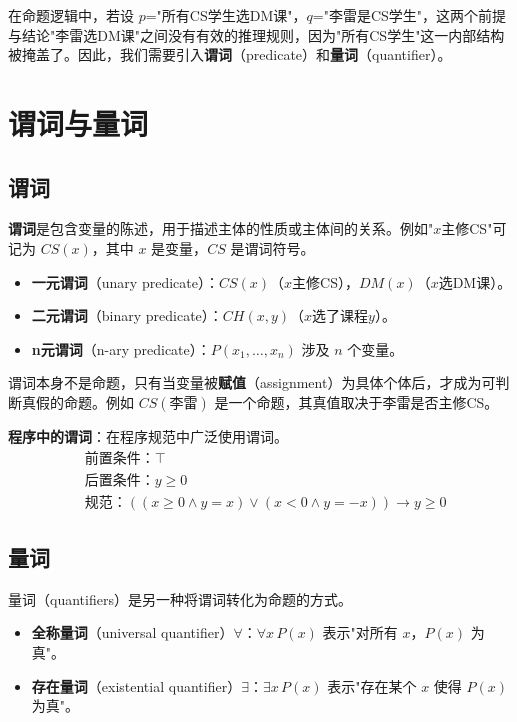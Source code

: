 \documentclass[UTF8,11pt,a4paper]{ctexbook}   %
\theoremstyle{definition}
\begin{document}
在命题逻辑中，若设 $p$="所有CS学生选DM课"，$q$="李雷是CS学生"，这两个前提与结论"李雷选DM课"之间没有有效的推理规则，因为"所有CS学生"这一内部结构被掩盖了。因此，我们需要引入\textbf{谓词}（predicate）和\textbf{量词}（quantifier）。

\section{谓词与量词}

\subsection{谓词}

\textbf{谓词}是包含变量的陈述，用于描述主体的性质或主体间的关系。例如"$x$主修CS"可记为 $CS(x)$，其中 $x$ 是变量，$CS$ 是谓词符号。

\begin{itemize}
    \item \textbf{一元谓词}（unary predicate）：$CS(x)$（$x$主修CS），$DM(x)$（$x$选DM课）。
    \item \textbf{二元谓词}（binary predicate）：$CH(x,y)$（$x$选了课程$y$）。
    \item \textbf{n元谓词}（n-ary predicate）：$P(x_1,\ldots,x_n)$ 涉及 $n$ 个变量。
\end{itemize}

谓词本身不是命题，只有当变量被\textbf{赋值}（assignment）为具体个体后，才成为可判断真假的命题。例如 $CS(\text{李雷})$ 是一个命题，其真值取决于李雷是否主修CS。

\textbf{程序中的谓词}：在程序规范中广泛使用谓词。
\[
\begin{aligned}
&\text{前置条件：}\top\\
&\text{后置条件：}y\geq 0\\
&\text{规范：}((x\geq 0\land y=x)\lor(x<0\land y=-x))\to y\geq 0
\end{aligned}
\]

\subsection{量词}

量词（quantifiers）是另一种将谓词转化为命题的方式。

\begin{itemize}
    \item \textbf{全称量词}（universal quantifier）$\forall$：$\forall x\,P(x)$ 表示"对所有 $x$，$P(x)$ 为真"。
    \item \textbf{存在量词}（existential quantifier）$\exists$：$\exists x\,P(x)$ 表示"存在某个 $x$ 使得 $P(x)$ 为真"。
\end{itemize}
\end{document}
